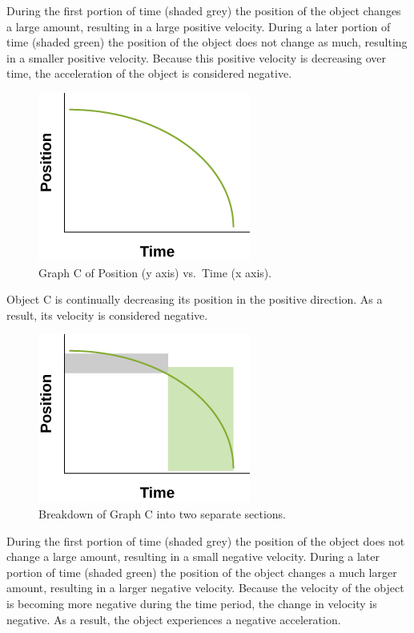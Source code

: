 \documentclass[
]{book}
\newenvironment{note}{}{}
\begin{document}
\begin{note}
During the first portion of time (shaded grey) the position of the
object changes a large amount, resulting in a large positive velocity.
During a later portion of time (shaded green) the position of the object
does not change as much, resulting in a smaller positive velocity.
Because this positive velocity is decreasing over time, the acceleration
of the object is considered negative.

\begin{figure}
\hypertarget{fs-id2059002}{%
\centering
\includegraphics{images/Figure_Ch2_M4_12.jpg}
\caption{Graph C of Position (y axis) vs.~Time (x
axis).}\label{fs-id2059002}
}
\end{figure}

Object C is continually decreasing its position in the positive
direction. As a result, its velocity is considered negative.

\begin{figure}
\hypertarget{fs-id2387653}{%
\centering
\includegraphics{images/Figure_Ch2_M4_13.jpg}
\caption{Breakdown of Graph C into two separate
sections.}\label{fs-id2387653}
}
\end{figure}

During the first portion of time (shaded grey) the position of the
object does not change a large amount, resulting in a small negative
velocity. During a later portion of time (shaded green) the position of
the object changes a much larger amount, resulting in a larger negative
velocity. Because the velocity of the object is becoming more negative
during the time period, the change in velocity is negative. As a result,
the object experiences a negative acceleration.

\end{note}
\end{document}

